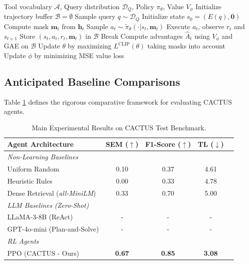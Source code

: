 \documentclass{article}
\begin{document}
\begin{algorithm}[h]
\caption{PPO with Autoregressive Action Masking for CACTUS}
\label{alg:ppo_cactus}
\begin{algorithmic}[1]
\REQUIRE Tool vocabulary $\mathcal{A}$, Query distribution $\mathcal{D}_Q$, Policy $\pi_\theta$, Value $V_\phi$
    \STATE Initialize trajectory buffer $\mathcal{B} = \emptyset$
        \STATE Sample query $q \sim \mathcal{D}_Q$
        \STATE Initialize state $s_0 = (E(q), \mathbf{0})$
            \STATE Compute mask $\mathbf{m}_t$ from $\mathbf{h}_t$
            \STATE Sample $a_t \sim \tilde{\pi}_\theta(\cdot | s_t, \mathbf{m}_t)$
            \STATE Execute $a_t$, observe $r_t$ and $s_{t+1}$
            \STATE Store $(s_t, a_t, r_t, \mathbf{m}_t)$ in $\mathcal{B}$
                \STATE Break
            \ENDIF
        \ENDFOR
    \ENDFOR
    \STATE Compute advantages $\hat{A}_t$ using $V_\phi$ and GAE on $\mathcal{B}$
    \STATE Update $\theta$ by maximizing $L^{\text{CLIP}}(\theta)$ taking masks into account
    \STATE Update $\phi$ by minimizing MSE value loss
\ENDFOR
\end{algorithmic}
\end{algorithm}

\subsection{Anticipated Baseline Comparisons}
Table \ref{tab:main_results} defines the rigorous comparative framework for evaluating CACTUS agents.

\begin{table}[h]
\centering
\caption{Main Experimental Results on CACTUS Test Benchmark.}
\label{tab:main_results}
\begin{tabular}{lcccc}
\toprule
\textbf{Agent Architecture} & \textbf{SEM ($\uparrow$)} & \textbf{F1-Score ($\uparrow$)} & \textbf{TL ($\downarrow$)} \\
\midrule
\textit{Non-Learning Baselines} \\
Uniform Random & 0.10 & 0.37 & 4.61 \\
Heuristic Rules & 0.00 & 0.33 & 4.78 \\
Dense Retrieval (\textit{all-MiniLM}) & 0.33 & 0.70 & 5.00 \\
\midrule
\textit{LLM Baselines (Zero-Shot)} \\
LLaMA-3-8B (ReAct) & - & - & - \\
GPT-4o-mini (Plan-and-Solve) & - & - & - \\
\midrule
\textit{RL Agents} \\
PPO (CACTUS - Ours) & \textbf{0.67} & \textbf{0.85} & \textbf{3.08} \\
\bottomrule
\end{tabular}
\end{table}
\end{document}
